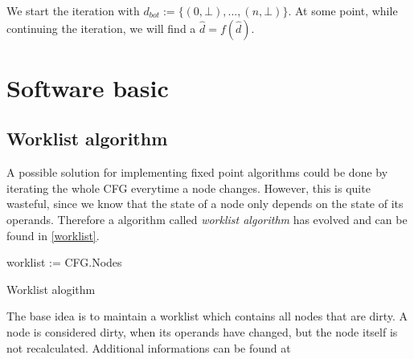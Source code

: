 We start the iteration with $d_{bot} := \{(0,\bot), ..., (n, \bot)\}$. At some point, while continuing the iteration, we will find a $\hat{d} = f(\hat{d})$. 


\section{Software basic}
\subsection{Worklist algorithm}

A possible solution for implementing fixed point algorithms could be done by iterating the whole CFG everytime a node changes. However, this is quite wasteful, since we know that the state of a node only depends on the state of its operands. Therefore a algorithm called \textit{worklist algorithm} has evolved and can be found in \autoref{worklist}.

\begin{algorithm}[H]
	worklist := {CFG.Nodes}\;
	\caption{Worklist alogithm}
	\label{worklist}
\end{algorithm}

The base idea is to maintain a worklist which contains all nodes that are dirty. A node is considered dirty, when its operands have changed, but the node itself is not recalculated. Additional informations can be found at \cite{iterative-data-flow-analysis-revisited}
